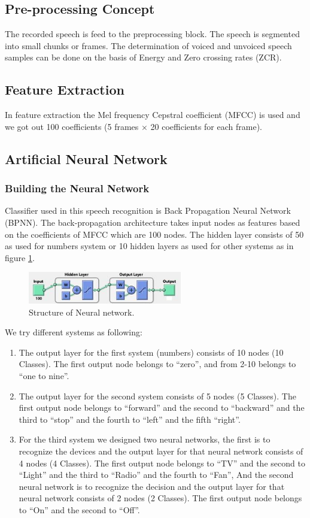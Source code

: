 \documentclass[12pt, a4paper, twoside]{report}
\begin{document}
\subsection{Pre-processing Concept}
The recorded speech is feed to the preprocessing block. The speech is segmented into small chunks or frames. The determination of voiced and unvoiced speech samples can be done on the basis of Energy and Zero crossing rates (ZCR). 
\subsection{Feature Extraction}
In feature extraction the Mel frequency Cepstral coefficient (MFCC) is used and we got out 100 coefficients (5 frames × 20 coefficients for each frame).
\subsection{Artificial Neural Network}
\subsubsection{Building the Neural Network}
Classifier used in this speech recognition is Back Propagation Neural Network (BPNN). The back-propagation architecture takes input nodes as features based on the coefficients of MFCC which are 100 nodes. The hidden layer consists of 50 as used for numbers system or 10 hidden layers as used for other systems as in figure \ref{fig:nn-structure}.
\begin{figure}[!h]
	\centering
	\includegraphics[width=0.6\textwidth]
	{images/chapter5/nn-structure}
	\caption{Structure of Neural network.}
	\label{fig:nn-structure}
\end{figure}

We try different systems as following:
\begin{enumerate}
\item The output layer for the first system (numbers) consists of 10 nodes (10 Classes). The first output node belongs to “zero”, and from 2-10 belongs to “one to nine”.
\item The output layer for the second system consists of 5 nodes (5 Classes). The first output node belongs to “forward” and the second to “backward” and the third to “stop” and the fourth to “left” and the fifth “right”.
\item For the third system we designed two neural networks, the first is to recognize the devices and the output layer for that neural network consists of 4 nodes (4 Classes).
The first output node belongs to ``TV'' and the second to ``Light'' and the third to ``Radio'' and the fourth to ``Fan'', And the second neural network is to recognize the decision and the output layer for that neural network consists of 2 nodes (2 Classes). The first output node belongs to ``On'' and the second to ``Off''.
\end{enumerate}
\end{document}

